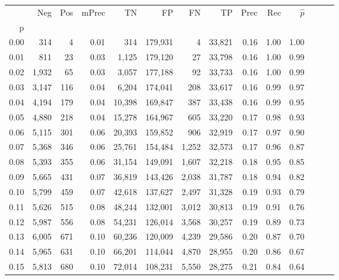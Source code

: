 \begin{tabular}{rrrrrrrrrrrrrr}
\toprule
{} &    Neg &  Pos & mPrec &       TN &       FP &      FN &      TP &  Prec &   Rec & $\hat{p}$ \\
p    &        &      &       &          &          &         &         &       &       &           \\
\midrule
0.00 &    314 &    4 &  0.01 &      314 &  179,931 &       4 &  33,821 &  0.16 &  1.00 &      1.00 \\
0.01 &    811 &   23 &  0.03 &    1,125 &  179,120 &      27 &  33,798 &  0.16 &  1.00 &      0.99 \\
0.02 &  1,932 &   65 &  0.03 &    3,057 &  177,188 &      92 &  33,733 &  0.16 &  1.00 &      0.99 \\
0.03 &  3,147 &  116 &  0.04 &    6,204 &  174,041 &     208 &  33,617 &  0.16 &  0.99 &      0.97 \\
0.04 &  4,194 &  179 &  0.04 &   10,398 &  169,847 &     387 &  33,438 &  0.16 &  0.99 &      0.95 \\
0.05 &  4,880 &  218 &  0.04 &   15,278 &  164,967 &     605 &  33,220 &  0.17 &  0.98 &      0.93 \\
0.06 &  5,115 &  301 &  0.06 &   20,393 &  159,852 &     906 &  32,919 &  0.17 &  0.97 &      0.90 \\
0.07 &  5,368 &  346 &  0.06 &   25,761 &  154,484 &   1,252 &  32,573 &  0.17 &  0.96 &      0.87 \\
0.08 &  5,393 &  355 &  0.06 &   31,154 &  149,091 &   1,607 &  32,218 &  0.18 &  0.95 &      0.85 \\
0.09 &  5,665 &  431 &  0.07 &   36,819 &  143,426 &   2,038 &  31,787 &  0.18 &  0.94 &      0.82 \\
0.10 &  5,799 &  459 &  0.07 &   42,618 &  137,627 &   2,497 &  31,328 &  0.19 &  0.93 &      0.79 \\
0.11 &  5,626 &  515 &  0.08 &   48,244 &  132,001 &   3,012 &  30,813 &  0.19 &  0.91 &      0.76 \\
0.12 &  5,987 &  556 &  0.08 &   54,231 &  126,014 &   3,568 &  30,257 &  0.19 &  0.89 &      0.73 \\
0.13 &  6,005 &  671 &  0.10 &   60,236 &  120,009 &   4,239 &  29,586 &  0.20 &  0.87 &      0.70 \\
0.14 &  5,965 &  631 &  0.10 &   66,201 &  114,044 &   4,870 &  28,955 &  0.20 &  0.86 &      0.67 \\
0.15 &  5,813 &  680 &  0.10 &   72,014 &  108,231 &   5,550 &  28,275 &  0.21 &  0.84 &      0.64 \\

\end{tabular}

